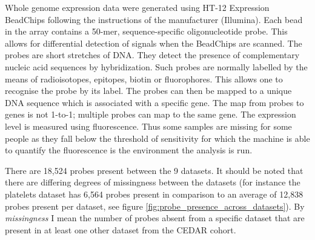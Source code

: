 \documentclass[12pt]{article} %
\begin{document}
	Whole genome expression data were generated using HT-12 Expression BeadChips following the instructions of the manufacturer (Illumina). Each bead in the array contains a 50-mer, sequence-specific oligonucleotide probe. This allows for differential detection of signals when the BeadChips are scanned. The probes are short stretches of DNA. They detect the presence of complementary nucleic acid sequences by hybridization. Such probes are normally labelled by the means of radioisotopes, epitopes, biotin or fluorophores. This allows one to recognise the probe by its label. The probes can then be mapped to a unique DNA sequence which is associated with a specific gene. The map from probes to genes is not 1-to-1; multiple probes can map to the same gene. The expression level is measured using fluorescence. Thus some samples are missing for some people as they fall below the threshold of sensitivity for which the machine is able to quantify the fluorescence is the environment the analysis is run.
	
	There are 18,524 probes present between the 9 datasets. It should be noted that there are differing degrees of missingness between the datasets (for instance the platelets dataset has 6,564 probes present in comparison to an average of 12,838 probes present per dataset, see figure \ref{fig:probe_presence_across_datasets}). By \emph{missingness} I mean the number of probes absent from a specific dataset that are present in at least one other dataset from the CEDAR cohort.
	
\end{document}
